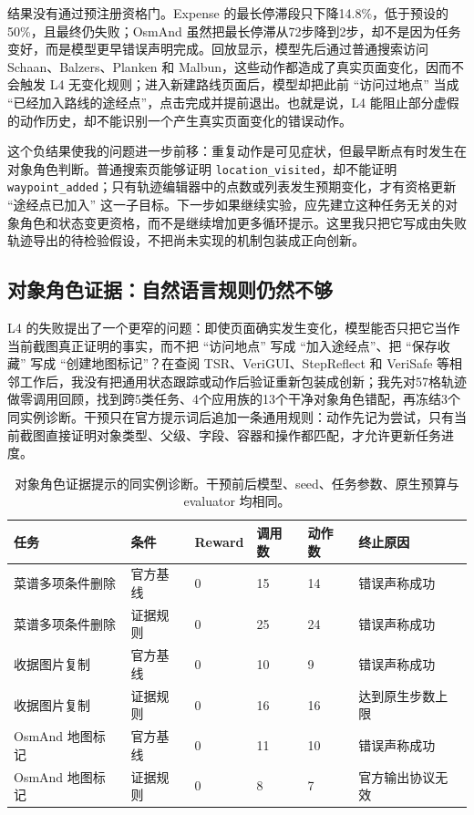 \documentclass[12pt,a4paper]{ctexart}
\newcommand{\code}[1]{\texttt{#1}}
\begin{document}
结果没有通过预注册资格门。Expense 的最长停滞段只下降14.8\%，低于预设的50\%，且最终仍失败；OsmAnd 虽然把最长停滞从72步降到2步，却不是因为任务变好，而是模型更早错误声明完成。回放显示，模型先后通过普通搜索访问 Schaan、Balzers、Planken 和 Malbun，这些动作都造成了真实页面变化，因而不会触发 L4 无变化规则；进入新建路线页面后，模型却把此前 ``访问过地点'' 当成 ``已经加入路线的途经点''，点击完成并提前退出。也就是说，L4 能阻止部分虚假的动作历史，却不能识别一个产生真实页面变化的错误动作。

这个负结果使我的问题进一步前移：重复动作是可见症状，但最早断点有时发生在对象角色判断。普通搜索页能够证明 \code{location\_visited}，却不能证明 \code{waypoint\_added}；只有轨迹编辑器中的点数或列表发生预期变化，才有资格更新 ``途经点已加入'' 这一子目标。下一步如果继续实验，应先建立这种任务无关的对象角色和状态变更资格，而不是继续增加更多循环提示。这里我只把它写成由失败轨迹导出的待检验假设，不把尚未实现的机制包装成正向创新。

\subsection{对象角色证据：自然语言规则仍然不够}

L4 的失败提出了一个更窄的问题：即使页面确实发生变化，模型能否只把它当作当前截图真正证明的事实，而不把 ``访问地点'' 写成 ``加入途经点''、把 ``保存收藏'' 写成 ``创建地图标记''？在查阅 TSR、VeriGUI、StepReflect 和 VeriSafe 等相邻工作后，我没有把通用状态跟踪或动作后验证重新包装成创新；我先对57格轨迹做零调用回顾，找到跨5类任务、4个应用族的13个干净对象角色错配，再冻结3个同实例诊断。干预只在官方提示词后追加一条通用规则：动作先记为尝试，只有当前截图直接证明对象类型、父级、字段、容器和操作都匹配，才允许更新任务进度。

\begin{table}[H]
    \centering
    \caption{对象角色证据提示的同实例诊断。干预前后模型、seed、任务参数、原生预算与 evaluator 均相同。}
    \label{tab:evidence-qualified}
    \scriptsize
    \begin{tabularx}{\textwidth}{p{3.7cm}p{1.8cm}p{1.2cm}p{1.5cm}p{1.5cm}Y}
        \toprule
        任务 & 条件 & Reward & 调用数 & 动作数 & 终止原因 \\
        \midrule
        菜谱多项条件删除 & 官方基线 & 0 & 15 & 14 & 错误声称成功 \\
        菜谱多项条件删除 & 证据规则 & 0 & 25 & 24 & 错误声称成功 \\
        收据图片复制 & 官方基线 & 0 & 10 & 9 & 错误声称成功 \\
        收据图片复制 & 证据规则 & 0 & 16 & 16 & 达到原生步数上限 \\
        OsmAnd 地图标记 & 官方基线 & 0 & 11 & 10 & 错误声称成功 \\
        OsmAnd 地图标记 & 证据规则 & 0 & 8 & 7 & 官方输出协议无效 \\
        \bottomrule
    \end{tabularx}
\end{table}
\end{document}
